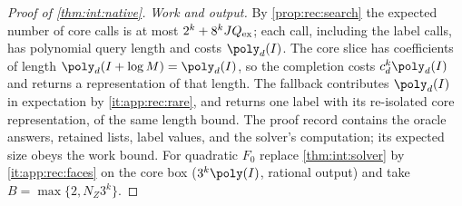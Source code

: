 \begin{proof}[Proof of \cref{thm:int:native}]
\emph{Work and output.} By \cref{prop:rec:search} the expected number of core
calls is at most $2^k+8^kJQ_{\rm ex}$; each call, including the label calls,
has polynomial query length and costs $\poly_d(I)$. The core slice has
coefficients of length $\poly_d(I+\log M)=\poly_d(I)$, so the completion costs
$c_d^k\poly_d(I)$ and returns a representation of that length. The fallback
contributes $\poly_d(I)$ in expectation by \ref{it:app:rec:rare}, and returns one
label with its re-isolated core representation, of the same length bound. The
proof record contains the oracle answers, retained lists, label values, and the
solver's computation; its expected size obeys the work bound. For quadratic
$F_0$ replace \cref{thm:int:solver} by \ref{it:app:rec:faces} on the core box
($3^k\poly(I)$, rational output) and take $B=\max\{2,N_Z3^k\}$.
\end{proof}

